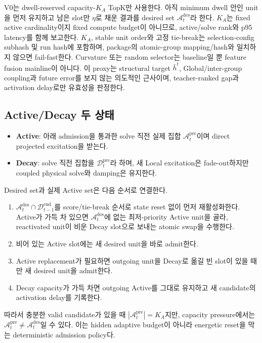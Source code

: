 \documentclass[11pt]{article}
\begin{document}
V0는 dwell-reserved capacity-\(K_A\) TopK만 사용한다.
아직 minimum dwell 안인 unit을 먼저 유지하고 남은 slot만 \(\eta\)로 채운 결과를
desired set \(\mathcal A_t^{\mathrm{des}}\)라 한다.
\(K_A\)는 fixed active cardinality이지 fixed compute budget이 아니므로,
active/solve rank와 p95 latency를 함께 보고한다.
\(K_A\), stable unit order와 고정 tie-break는 selection-config subhash 및 run hash에 포함하며,
package의 atomic-group mapping/hash와 일치하지 않으면 fail-fast한다.
Curvature 또는 random selector는 baseline일 뿐 feature fusion mainline이 아니다.
이 proxy는 structural target \(\bar h^t\), Global/inter-group coupling과 future error를 보지 않는
의도적인 근사이며, teacher-ranked gap과 activation delay로만 유효성을 판정한다.

\subsection{Active/Decay 두 상태}

\begin{itemize}
  \item \textbf{Active}: 아래 admission을 통과한 solve 직전 실제 집합
  \(\mathcal A_t^{\mathrm{pre}}\)이며
  direct projected excitation을 받는다.
  \item \textbf{Decay}: solve 직전 집합을 \(\mathcal D_t^{\mathrm{pre}}\)라 하며,
  새 Local excitation은 fade-out하지만 coupled physical solve와 damping은 유지한다.
\end{itemize}

Desired set과 실제 Active set은 다음 순서로 연결한다.

\begin{enumerate}
  \item \(\mathcal A_t^{\mathrm{des}}\cap\mathcal D_{t-1}^{\mathrm{end}}\)를 score/tie-break 순서로
  state reset 없이 먼저 재활성화한다. Active가 가득 차 있으면
  \(\mathcal A_t^{\mathrm{des}}\)에 없는 최저-priority Active unit을 골라,
  reactivated unit이 비운 Decay slot으로 보내는 atomic swap을 수행한다.
  \item 비어 있는 Active slot에는 새 desired unit을 바로 admit한다.
  \item Active replacement가 필요하면 outgoing unit을 Decay로 옮길 빈 slot이 있을 때만
  새 desired unit을 admit한다.
  \item Decay capacity가 가득 차면 outgoing Active를 그대로 유지하고 새 candidate의
  activation delay를 기록한다.
\end{enumerate}

따라서 충분한 valid candidate가 있을 때 \(|\mathcal A_t^{\mathrm{pre}}|=K_A\)지만,
capacity pressure에서는 \(\mathcal A_t^{\mathrm{pre}}\neq\mathcal A_t^{\mathrm{des}}\)일 수 있다.
이는 hidden adaptive budget이 아니라 energetic reset을 막는 deterministic admission policy다.
\end{document}
